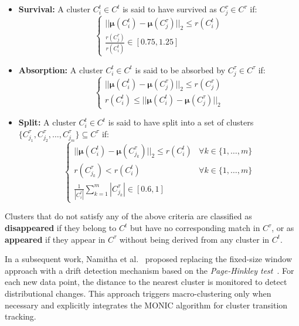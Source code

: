 \begin{itemize}
    \item \textbf{Survival:} A cluster $ C_i^{t} \in C^t $ is said to have
          survived as $ C_j^{\tau} \in C^\tau $ if:
          \[
              \begin{cases}
                  ||\boldsymbol{\mu}(C_i^{t}) - \boldsymbol{\mu}(C_j^{\tau})||_2 \le r(C_i^{t}) \\
                  \frac{r(C_j^{\tau})}{r(C_i^t)} \in [0.75, 1.25]
              \end{cases}
          \]

    \item \textbf{Absorption:} A cluster $ C_i^{t} \in C^t $ is said to be
          absorbed by $ C_j^{\tau} \in C^\tau $ if:
          \[
              \begin{cases}
                  ||\boldsymbol{\mu}(C_i^{t}) - \boldsymbol{\mu}(C_j^{\tau})||_2 \le r(C_j^{\tau}) \\
                  r(C_i^{t}) \le ||\boldsymbol{\mu}(C_i^{t}) - \boldsymbol{\mu}(C_j^{\tau})||_2
              \end{cases}
          \]

    \item \textbf{Split:} A cluster $ C_i^{t} \in C^t $ is said to have split into a set of clusters
          $ \{C_{j_1}^{\tau}, C_{j_2}^{\tau}, \dots, C_{j_m}^{\tau}\} \subseteq C^\tau $ if:
          \[
              \begin{cases}
                  ||\boldsymbol{\mu}(C_i^{t}) - \boldsymbol{\mu}(C_{j_k}^{\tau})||_2 \le r(C_i^{t}) & \forall k \in \{1, \dots, m\} \\
                  r(C_{j_k}^{\tau}) < r(C_i^{t})                        & \forall k \in \{1, \dots, m\} \\
                  \frac{1}{|C_i^{t}|} \sum_{k=1}^{m} |C_{j_k}^{\tau}| \in [0.6, 1]
              \end{cases}
          \]
\end{itemize}

Clusters that do not satisfy any of the above criteria are classified as
\textbf{disappeared} if they belong to $ C^t $ but have no corresponding match
in $ C^\tau $, or as \textbf{appeared} if they appear in $ C^\tau $ without
being derived from any cluster in $ C^t $.

In a subsequent work, Namitha et al.~\cite{namitha_dynamic_clustering_2}
proposed replacing the fixed-size window approach with a drift detection
mechanism based on the \emph{Page-Hinkley test}~\cite{page_hinkley}. For each new data
point, the distance to the nearest cluster is monitored to detect
distributional changes. This approach triggers macro-clustering only when
necessary and explicitly integrates the MONIC algorithm for cluster transition
tracking.

